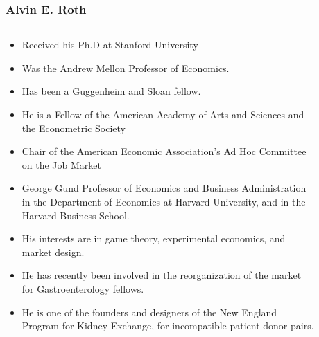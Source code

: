 \documentclass[10pt,pdf,hyperref={unicode}]{beamer}
\begin{document}
\begin{frame}
    \frametitle{Alvin E. Roth}
    \begin{columns}
        \begin{column}{.5\textwidth}
            \scriptsize{
            \begin{itemize}
                \item Received his Ph.D at Stanford University
                \item Was the Andrew Mellon Professor of Economics.
                \item Has been a Guggenheim and Sloan fellow.
                \item He is a Fellow of the American Academy of Arts and Sciences and the Econometric Society
                \item Chair of the American Economic Association's Ad Hoc Committee on the Job Market
                \item George Gund Professor of Economics and Business Administration in the Department of Economics at Harvard University, and in the Harvard Business School.
                \item His interests are in game theory, experimental economics, and market design.
                \item He has recently been involved in the reorganization of the market for Gastroenterology fellows.
                \item He is one of the founders and designers of the New England Program for Kidney Exchange, for incompatible patient-donor pairs.
            \end{itemize}
            }
        \end{column}
        \begin{column}{.5\textwidth}
            \begin{figure}[H]
                \noindent{}
            \end{figure}
        \end{column}
    \end{columns}
\end{frame}
\end{document}
